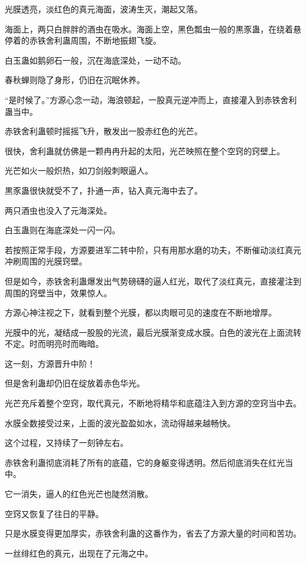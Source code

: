 
\begin{this_body}

光膜透亮，淡红色的真元海面，波涛生灭，潮起又落。

海面上，两只白胖胖的酒虫在吸水。海面上空，黑色瓢虫一般的黒豕蛊，在绕着悬停着的赤铁舍利蛊周围，不断地振翅飞旋。

白玉蛊如鹅卵石一般，沉在海底深处，一动不动。

春秋蝉则隐了身形，仍旧在沉眠休养。

“是时候了。”方源心念一动，海浪顿起，一股真元逆冲而上，直接灌入到赤铁舍利蛊当中。

赤铁舍利蛊顿时摇摇飞升，散发出一股赤红色的光芒。

很快，舍利蛊就仿佛是一颗冉冉升起的太阳，光芒映照在整个空窍的窍壁上。

光芒如火一般炽热，如刀剑般刺眼逼人。

黒豕蛊很快就受不了，扑通一声，钻入真元海中去了。

两只酒虫也没入了元海深处。

白玉蛊则在海底深处一闪一闪。

若按照正常手段，方源要进军二转中阶，只有用那水磨的功夫，不断催动淡红真元冲刷周围的光膜窍壁。

但是如今，赤铁舍利蛊爆发出气势磅礴的逼人红光，取代了淡红真元，直接灌注到周围的窍壁当中，效果惊人。

方源心神注视之下，就看到整个光膜，都以肉眼可见的速度在不断地增厚。

光膜中的光，凝结成一股股的光流，最后光膜渐变成水膜。白色的波光在上面流转不定。时而明亮时而晦暗。

这一刻，方源晋升中阶！

但是舍利蛊却仍旧在绽放着赤色华光。

光芒充斥着整个空窍，取代真元，不断地将精华和底蕴注入到方源的空窍当中去。

水膜全数接受过来，上面的波光盈盈如水，流动得越来越畅快。

这个过程，又持续了一刻钟左右。

赤铁舍利蛊彻底消耗了所有的底蕴，它的身躯变得透明。然后彻底消失在红光当中。

它一消失，逼人的红色光芒也陡然消散。

空窍又恢复了往日的平静。

只是水膜变得更加厚实，赤铁舍利蛊的这番作为，省去了方源大量的时间和苦功。

一丝绯红色的真元，出现在了元海之中。


\end{this_body}

